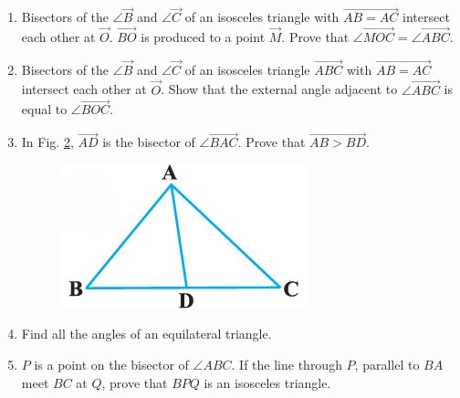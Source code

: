 \begin{enumerate}[label=\thesection.\arabic*,ref=\thesection.\theenumi]
\begin{figure}[h]
	\caption{}
	\label{fig:exemplar/9.7.37.3.8}
\end{figure}
\item Bisectors of the $\angle \vec{B}$ and $\angle \vec{C}$ of an isosceles triangle with $\vec{AB=AC}$ intersect each other at $\vec{O}$. $\vec{BO}$ is produced to a point $\vec{M}$. Prove that $\angle \vec{MOC}= \angle \vec{ABC}$.
\item Bisectors of the $\angle \vec{B}$ and $\angle \vec{C}$ of an isosceles triangle $\vec{ABC}$ with $\vec{AB=AC}$ intersect each other at $\vec{O}$. Show that the external angle adjacent to $\angle \vec{ABC}$ is equal to $\angle \vec{BOC}$.
\item In Fig. \ref{fig:exemplar/9.7.37.3.11}, $\vec{AD}$ is the bisector of $\angle \vec{BAC}$. Prove that $\vec{AB>BD}$.
\begin{figure}[h]
	\centering
	\includegraphics[width=\columnwidth]{exemplar/9.7.3/figs/Figure5.png}
	\caption{}
	\label{fig:exemplar/9.7.37.3.11}
\end{figure}
\item Find all the angles of an equilateral triangle.
%
\item $P$ is a point on the bisector of $\angle ABC$. If the line through $P$, parallel to $BA$ meet $BC$ at $Q$, prove that $BPQ$ is an isosceles triangle.

\end{enumerate}
